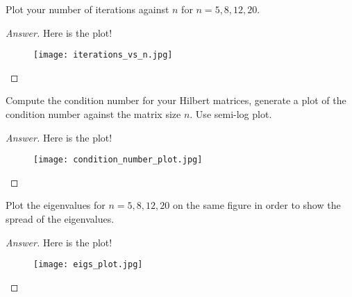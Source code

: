 \documentclass{article}
\begin{document}
        \item Plot your number of iterations against $n$ for 
        $n = 5, 8, 12, 20$.
        \begin{proof}[Answer]
        Here is the plot!
        \begin{figure}[h!]
            \centering
            \texttt{[image: iterations\_vs\_n.jpg]}
        \end{figure}
        \end{proof}

        \item Compute the condition number for your Hilbert matrices, 
        generate a plot of the condition number against the matrix size $n$. 
        Use semi-log plot.
        \begin{proof}[Answer]
        Here is the plot!
        \begin{figure}[h!]
            \centering
            \texttt{[image: condition\_number\_plot.jpg]}
        \end{figure}
        \end{proof}

       \item Plot the eigenvalues for $n = 5, 8, 12, 20$ on the same figure 
        in order to show the spread of the eigenvalues.
        \begin{proof}[Answer]
        Here is the plot!
        \begin{figure}[h!]
            \centering
            \texttt{[image: eigs\_plot.jpg]}
        \end{figure}
        \end{proof}
\end{document}
